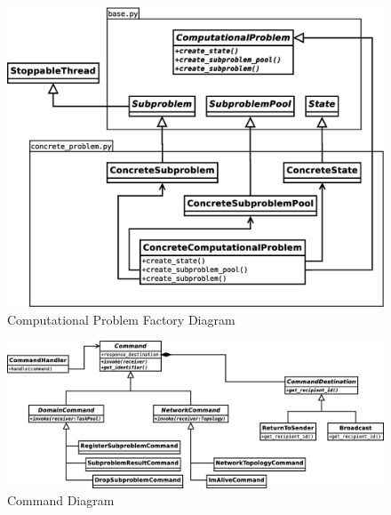 \documentclass{article}
\begin{document}
\begin{figure}[H]
	\centering
	\includegraphics[width=\linewidth]{diagrams/FactoryDiagram.eps}
	\caption{Computational Problem Factory Diagram}
\end{figure}

\begin{figure}[H]
	\centering
	\includegraphics[width=\linewidth]{diagrams/CommandDiagram.eps}
	\caption{Command Diagram}
\end{figure}

\newpage
\end{document}
